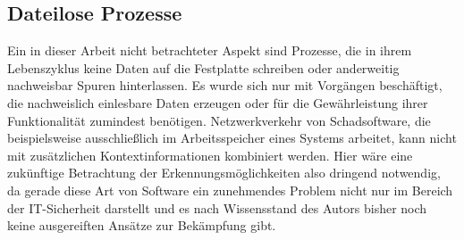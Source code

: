 \subsection{Dateilose Prozesse}
Ein in dieser Arbeit nicht betrachteter Aspekt sind Prozesse, die in ihrem Lebenszyklus keine Daten auf die Festplatte schreiben oder anderweitig nachweisbar Spuren hinterlassen. Es wurde sich nur mit Vorgängen beschäftigt, die nachweislich einlesbare Daten erzeugen oder für die Gewährleistung ihrer Funktionalität zumindest benötigen. Netzwerkverkehr von Schadsoftware, die beispielsweise ausschließlich im Arbeitsspeicher eines Systems arbeitet, kann nicht mit zusätzlichen Kontextinformationen kombiniert werden. Hier wäre eine zukünftige Betrachtung der Erkennungsmöglichkeiten also dringend notwendig, da gerade diese Art von Software ein zunehmendes Problem nicht nur im Bereich der IT-Sicherheit darstellt und es nach Wissensstand des Autors bisher noch keine ausgereiften Ansätze zur Bekämpfung gibt.

